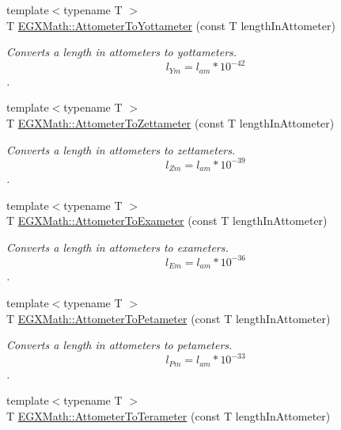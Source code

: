 \begin{DoxyCompactItemize}
{\footnotesize template$<$typename T $>$ }\\T \mbox{\hyperlink{group___e_g_x_math-_conversions-_length_conversions-_s_i-_attometer-_s_i_gaaa5d4078879169021c8f2857c02a7aed}{E\+G\+X\+Math\+::\+Attometer\+To\+Yottameter}} (const T length\+In\+Attometer)
\begin{DoxyCompactList}\small\item\em Converts a length in attometers to yottameters. \[ l_{Ym}=l_{am} * 10^{-42} \]. \end{DoxyCompactList}\item 
{\footnotesize template$<$typename T $>$ }\\T \mbox{\hyperlink{group___e_g_x_math-_conversions-_length_conversions-_s_i-_attometer-_s_i_ga64b586463e4d2d7bbc63e43e8205383b}{E\+G\+X\+Math\+::\+Attometer\+To\+Zettameter}} (const T length\+In\+Attometer)
\begin{DoxyCompactList}\small\item\em Converts a length in attometers to zettameters. \[ l_{Zm}=l_{am} * 10^{-39} \]. \end{DoxyCompactList}\item 
{\footnotesize template$<$typename T $>$ }\\T \mbox{\hyperlink{group___e_g_x_math-_conversions-_length_conversions-_s_i-_attometer-_s_i_gaca9be6820446effaa50024d2ccc3eea8}{E\+G\+X\+Math\+::\+Attometer\+To\+Exameter}} (const T length\+In\+Attometer)
\begin{DoxyCompactList}\small\item\em Converts a length in attometers to exameters. \[ l_{Em}=l_{am} * 10^{-36} \]. \end{DoxyCompactList}\item 
{\footnotesize template$<$typename T $>$ }\\T \mbox{\hyperlink{group___e_g_x_math-_conversions-_length_conversions-_s_i-_attometer-_s_i_ga780e4aa3b174598a72aefa3bdd960447}{E\+G\+X\+Math\+::\+Attometer\+To\+Petameter}} (const T length\+In\+Attometer)
\begin{DoxyCompactList}\small\item\em Converts a length in attometers to petameters. \[ l_{Pm}=l_{am} * 10^{-33} \]. \end{DoxyCompactList}\item 
{\footnotesize template$<$typename T $>$ }\\T \mbox{\hyperlink{group___e_g_x_math-_conversions-_length_conversions-_s_i-_attometer-_s_i_gac4d61e3aceb437ff7d52729ed4860f61}{E\+G\+X\+Math\+::\+Attometer\+To\+Terameter}} (const T length\+In\+Attometer)

\end{DoxyCompactItemize}

